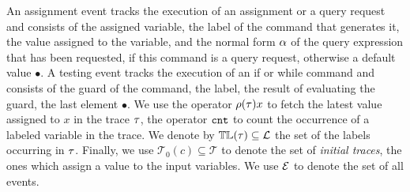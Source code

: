 An assignment event tracks the execution of an assignment  or a query request and consists of the assigned variable, the label of the command that generates it, the value assigned to the variable, and the normal form  $\alpha$ of the query expression that has been requested, if this command is a query request, otherwise a default value $\bullet$.
A testing event tracks the execution of an if or while command and consists of the guard of the command, the label, the result of evaluating the guard, the last element $\bullet$. 
 We use the operator $\rho (\mathtt{\tau}) x$ to fetch the latest value assigned to  $x$ in the trace $\mathtt{\tau}$, the operator
$\mathtt{cnt}$ to count the occurrence of a labeled variable in the trace. 
We denote by $\mathbb{TL}(\mathtt{\tau}) \subseteq \mathcal{L}$ the set of the labels occurring in $\mathtt{\tau}$.
Finally, we use $\mathcal{T}_0(c) \subseteq \mathcal{T}$ to denote the set of \emph{initial traces}, the ones
which assign a value to the input variables. We use $\mathcal{E}$ to denote the set of all events.


